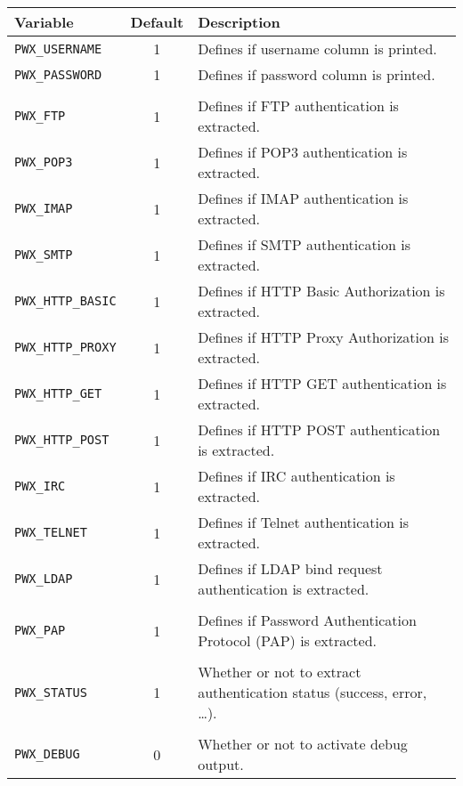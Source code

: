 \documentclass[documentation]{subfiles}
\begin{document}
\begin{longtable}{lcl}
    \toprule
    {\bf Variable} & {\bf Default} & {\bf Description} \\
    \midrule\endhead%
    {\tt PWX\_USERNAME}    & 1 & Defines if username column is printed.\\
    {\tt PWX\_PASSWORD}    & 1 & Defines if password column is printed.\\\\
    {\tt PWX\_FTP}         & 1 & Defines if FTP authentication is extracted.\\
    {\tt PWX\_POP3}        & 1 & Defines if POP3 authentication is extracted.\\
    {\tt PWX\_IMAP}        & 1 & Defines if IMAP authentication is extracted.\\
    {\tt PWX\_SMTP}        & 1 & Defines if SMTP authentication is extracted.\\
    {\tt PWX\_HTTP\_BASIC} & 1 & Defines if HTTP Basic Authorization is extracted.\\
    {\tt PWX\_HTTP\_PROXY} & 1 & Defines if HTTP Proxy Authorization is extracted.\\
    {\tt PWX\_HTTP\_GET}   & 1 & Defines if HTTP GET authentication is extracted.\\
    {\tt PWX\_HTTP\_POST}  & 1 & Defines if HTTP POST authentication is extracted.\\
    {\tt PWX\_IRC}         & 1 & Defines if IRC authentication is extracted.\\
    {\tt PWX\_TELNET}      & 1 & Defines if Telnet authentication is extracted.\\
    {\tt PWX\_LDAP}        & 1 & Defines if LDAP bind request authentication is extracted.\\\\
    {\tt PWX\_PAP}         & 1 & Defines if Password Authentication Protocol (PAP) is extracted.\\\\
    {\tt PWX\_STATUS}      & 1 & Whether or not to extract authentication status (success, error, \ldots).\\\\
    {\tt PWX\_DEBUG}       & 0 & Whether or not to activate debug output.\\
    \bottomrule
\end{longtable}

\end{document}
